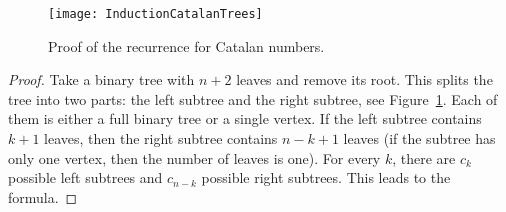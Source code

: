

\setcounter{section}{4}
\setcounter{subsection}{1}
\setcounter{dfn}{2}


\begin{figure}[ht]
\begin{center}
\texttt{[image: InductionCatalanTrees]}
\end{center}
\caption{Proof of the recurrence for Catalan numbers.}
\label{fig:InductionCatalanTrees}
\end{figure}

\begin{proof}
Take a binary tree with $n+2$ leaves and remove its root.
This splits the tree into two parts: the left subtree and the right subtree, see Figure~\ref{fig:InductionCatalanTrees}.
Each of them is either a full binary tree or a single vertex.
If the left subtree contains $k+1$ leaves, then the right subtree contains $n-k+1$ leaves
(if the subtree has only one vertex, then the number of leaves is one).
For every $k$, there are $c_k$ possible left subtrees and $c_{n-k}$ possible right subtrees.
This leads to the formula.
\end{proof}




